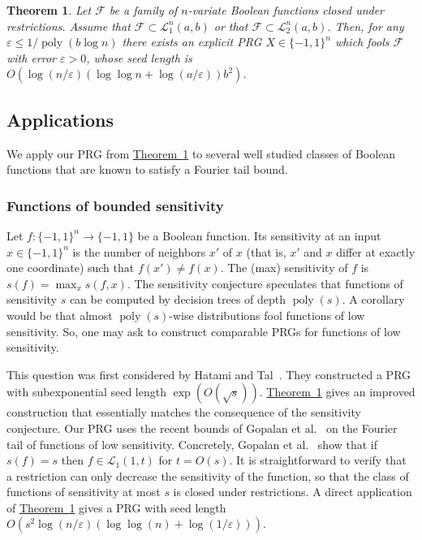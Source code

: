 \documentclass[11pt]{article}
\numberwithin{equation}{section}
\newtheorem{theorem}{Theorem}[section]
\theoremstyle{definition}
\theoremstyle{plain}
\newcommand{\expref}[2]{\hyperref[#2]{#1~\ref{#2}}}
\newcommand{\FF}{\mathcal{F}}
\newcommand{\LL}{\mathcal{L}}
\newcommand{\eps}{\varepsilon}
\DeclareMathOperator{\poly}{poly}      %
\begin{document}
\begin{theorem}
\label{thm:L1}
Let $\FF$ be a family of $n$-variate Boolean functions closed under restrictions. Assume that $\FF \subset \LL_1^n(a,b)$ or that $\FF \subset \LL_2^n(a,b)$.
	Then, for any $\eps\leq {1}/{\poly(b \log n)}$ there exists an explicit PRG $X \in \{-1,1\}^n$ which fools $\FF$ with error $\eps>0$,
whose seed length is $O(\log(n/\eps)  (\log\log n + \log(a/\eps)) b^2)$.
\end{theorem}

\subsection{Applications}
We apply our PRG from \expref{Theorem}{thm:L1} to several well studied classes of Boolean functions that are known to satisfy a Fourier tail bound.

\subsubsection{Functions of bounded sensitivity}
Let $f:\{-1,1\}^n \to \{-1,1\}$ be a Boolean function. Its sensitivity at an input $x \in \{-1,1\}^n$ is the number of neighbors $x'$ of $x$
(that is, $x'$ and $x$ differ at exactly one coordinate)
such that $f(x') \ne f(x)$. The (max) sensitivity of $f$ is $s(f)=\max_x s(f,x)$. The sensitivity conjecture speculates
that functions of sensitivity $s$ can be computed by decision trees of depth $\poly(s)$. A corollary would be that almost $\poly(s)$-wise
distributions fool functions of low sensitivity. So, one may ask to construct comparable PRGs for functions of low sensitivity.

This question was first considered by Hatami and Tal~\cite{hatami2017pseudorandom}. They constructed a PRG with subexponential seed length
$\exp(O(\sqrt{s}))$. \expref{Theorem}{thm:L1} gives an improved construction that essentially matches the consequence of the sensitivity conjecture. Our PRG uses the recent bounds of Gopalan {et al.}~\cite{gopalan2016degree}
on the Fourier tail of functions of low sensitivity. Concretely,
Gopalan {et al.}~\cite{gopalan2016degree} show that if $s(f)=s$ then $f \in \LL_1(1,t)$ for $t=O(s)$.
It is straightforward to verify that a restriction can only decrease the sensitivity of the function, so that the
class of functions of sensitivity at most $s$ is closed under restrictions.
A direct application of \expref{Theorem}{thm:L1} gives a PRG with seed length $O(s^2 \log(n/\eps) (\log\log(n) + \log(1/\eps)))$.
\end{document}
